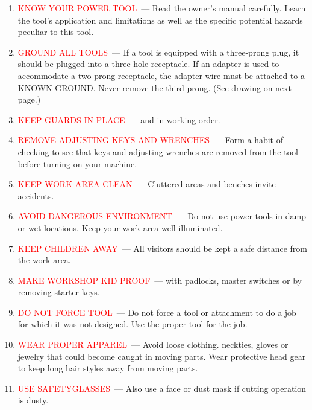 \begin{enumerate}
\item\textcolor{Red}{KNOW YOUR POWER TOOL}\ --- Read the owner's manual
carefully. Learn the tool's application and limitations as well as the specific
potential hazards peculiar to this tool.

\item\textcolor{Red}{GROUND ALL TOOLS}\ --- If a tool is equipped with a
three-prong plug, it should be plugged into a three-hole receptacle. If an
adapter is used to accommodate a two-prong receptacle, the adapter wire must be
attached to a KNOWN GROUND. Never remove the third prong. (See drawing on next
page.)

\item\textcolor{Red}{KEEP GUARDS IN PLACE}\ --- and in working order.

\item\textcolor{Red}{REMOVE ADJUSTING KEYS AND WRENCHES}\ --- Form a habit of
checking to see that keys and adjusting wrenches are removed from the tool
before turning on your machine.

\item\textcolor{Red}{KEEP WORK AREA CLEAN}\ --- Cluttered areas and benches
invite accidents.

\item\textcolor{Red}{AVOID DANGEROUS ENVIRONMENT}\ --- Do not use
power tools in damp or wet locations. Keep your work area well illuminated.

\item\textcolor{Red}{KEEP CHILDREN AWAY}\ --- All visitors should be kept a safe
distance from the work area.

\item\textcolor{Red}{MAKE WORKSHOP KID PROOF}\ --- with padlocks, master
switches or by removing starter keys.

\item\textcolor{Red}{DO NOT FORCE TOOL}\ --- Do not force a tool or attachment
to do a job for which it was not designed. Use the proper tool for the job.

\item\textcolor{Red}{WEAR PROPER APPAREL}\ --- Avoid loose clothing. neckties,
gloves or jewelry that could become caught in moving parts. Wear protective head
gear to keep long hair styles away from moving parts.

\item\textcolor{Red}{USE SAFETYGLASSES}\ --- Also use a face or dust mask if
cutting operation is dusty.


\end{enumerate}

